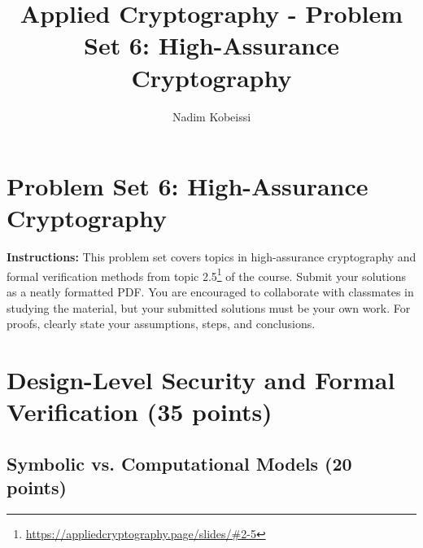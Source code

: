 \documentclass[10pt,a4paper,american]{article}
\title{Applied Cryptography - Problem Set 6: High-Assurance Cryptography}
\author{Nadim Kobeissi}
\begin{document}
\classhandoutheader
\section*{Problem Set 6: High-Assurance Cryptography}

\begin{tcolorbox}[colframe=OliveGreen!30!white,colback=OliveGreen!5!white]
	\textbf{Instructions:} This problem set covers topics in high-assurance cryptography and formal verification methods from topic 2.5\footnote{\url{https://appliedcryptography.page/slides/\#2-5}} of the course. Submit your solutions as a neatly formatted PDF. You are encouraged to collaborate with classmates in studying the material, but your submitted solutions must be your own work. For proofs, clearly state your assumptions, steps, and conclusions.
\end{tcolorbox}

\section{Design-Level Security and Formal Verification (35 points)}

\subsection{Symbolic vs. Computational Models (20 points)}
\end{document}
